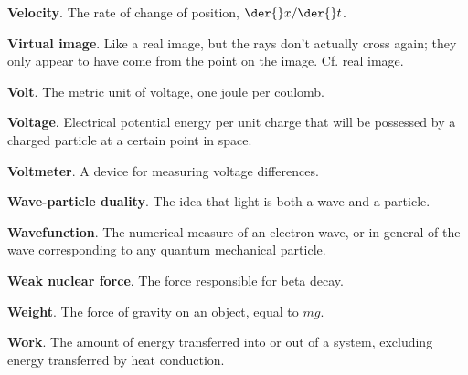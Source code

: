 \textbf{Velocity}. The rate of change of position, $\der{}x/\der{}t$. 

\textbf{Virtual image}. Like a real image, but the rays don't actually cross again; they only appear to have
come from the point on the image. Cf. real image. 

\textbf{Volt}. The metric unit of voltage, one joule per coulomb. 

\textbf{Voltage}. Electrical potential energy per unit charge that will be possessed by a charged particle at
a certain point in space. 

\textbf{Voltmeter}. A device for measuring voltage differences. 

\textbf{Wave-particle duality}. The idea that light is both a wave and a particle.

\textbf{Wavefunction}. The numerical measure of an electron wave, or in general of the wave corresponding to
any quantum mechanical particle.

\textbf{Weak nuclear force}. The force responsible for beta decay. 

\textbf{Weight}. The force of gravity on an object, equal to $mg$. 

\textbf{Work}. The amount of energy transferred into or out of a system, excluding energy transferred by heat
conduction.

